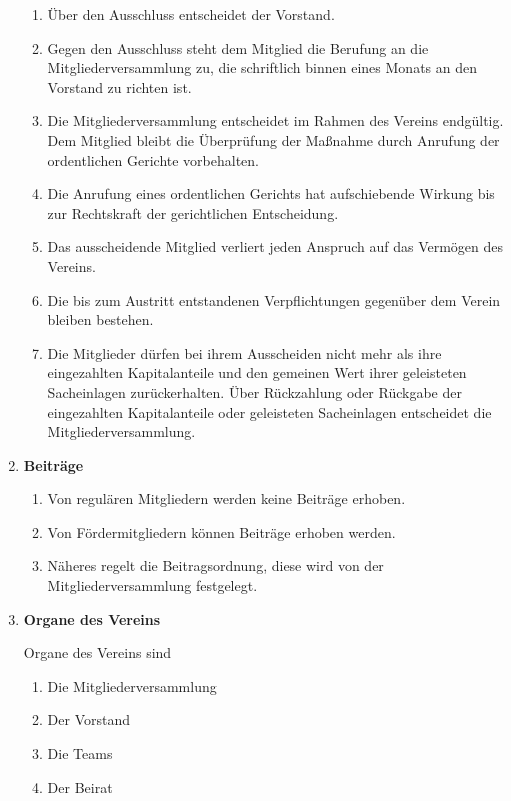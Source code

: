 \documentclass[german]{article}
\newcommand{\paragr}[1]{\item \textsf{\textbf{#1}}}
\begin{document}
\begin{enumerate}
\begin{enumerate}
\item Über den Ausschluss entscheidet der Vorstand.

\item Gegen den Ausschluss steht dem Mitglied die Berufung an die Mitgliederversammlung zu, die schriftlich binnen eines Monats an den Vorstand zu richten ist.

\item Die Mitgliederversammlung entscheidet im Rahmen des Vereins endgültig.
Dem Mitglied bleibt die Überprüfung der Maßnahme durch Anrufung der ordentlichen Gerichte vorbehalten.

\item Die Anrufung eines ordentlichen Gerichts hat aufschiebende Wirkung bis zur Rechtskraft der gerichtlichen Entscheidung.

\item Das ausscheidende Mitglied verliert jeden Anspruch auf das Vermögen des Vereins.

\item Die bis zum Austritt entstandenen Verpflichtungen gegenüber dem Verein bleiben bestehen.

\item Die Mitglieder dürfen bei ihrem Ausscheiden nicht mehr als ihre eingezahlten Kapitalanteile und den gemeinen Wert ihrer geleisteten Sacheinlagen zurückerhalten.
Über Rückzahlung oder Rückgabe der eingezahlten Kapitalanteile oder geleisteten Sacheinlagen  entscheidet die Mitgliederversammlung.

\end{enumerate}


\paragr{Beiträge}
\begin{enumerate}

\item Von regulären Mitgliedern werden keine Beiträge erhoben.

\item Von Fördermitgliedern können Beiträge erhoben werden.

\item Näheres regelt die Beitragsordnung, diese wird von der Mitgliederversammlung festgelegt.

\end{enumerate}


\paragr{Organe des Vereins}

Organe des Vereins sind
\begin{enumerate}
\item Die Mitgliederversammlung
\item Der Vorstand
\item Die Teams
\item Der Beirat
\end{enumerate}



\end{enumerate}
\end{document}
